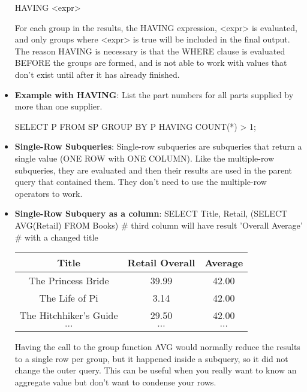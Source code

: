 \documentclass{report}
\begin{document}
\begin{itemize}
\begin{sqlcode}
            HAVING <expr>
            \end{sqlcode}
            \bigbreak \noindent 
            For each group in the results, the HAVING expression, <expr> is evaluated, and only groups where <expr> is true will be included in the final output.
            \bigbreak \noindent 
            The reason HAVING is necessary is that the WHERE clause is evaluated BEFORE the groups are formed, and is not able to work with values that don't exist until after it has already finished.
        \item \textbf{Example with HAVING}: List the part numbers for all parts supplied by more than one supplier.
            \bigbreak \noindent 
            \begin{sqlcode}
                SELECT P
                    FROM SP
                    GROUP BY P
                    HAVING COUNT(*) > 1;
            \end{sqlcode}
        \item \textbf{Single-Row Subqueries}: Single-row subqueries are subqueries that return a single value (ONE ROW with ONE COLUMN).
            \bigbreak \noindent 
            Like the multiple-row subqueries, they are evaluated and then their results are used in the parent query that contained them.
            \bigbreak \noindent 
            They don't need to use the multiple-row operators to work.
            \bigbreak \noindent 
        \item \textbf{Single-Row Subquery as a column}: SELECT Title, Retail, (SELECT AVG(Retail) FROM Books) \# third column will have result 'Overall Average' \# with a changed title
            \bigbreak \noindent 
            \begin{center}
                \begin{tabular}{c|c|c}
                    Title &Retail Overall &Average \\
                    \hline
                    The Princess Bride &39.99 &42.00  \\
                    The Life of Pi &3.14 &42.00 \\
                    The Hitchhiker's Guide &29.50 &42.00 \\
                    $\cdots$ & $\cdots$ & $\cdots $
                \end{tabular}
            \end{center}
            \bigbreak \noindent 
            Having the call to the group function AVG would normally reduce the results to a single row per group, but it happened inside a subquery, so it did not change the outer query. This can be useful when you really want to know an aggregate value but don't want to condense your rows.

\end{itemize}
\end{document}
